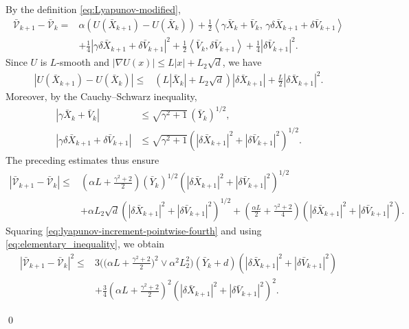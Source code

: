 \documentclass[12pt]{article}
\newenvironment{redtext}
  {\color{black}\ignorespaces}
  {\ignorespacesafterend}
\numberwithin{equation}{section}
\renewenvironment{proof}%
  {\begin{trivlist}%
   \item[]\ignorespaces}%
  {\qed\end{trivlist}}
\begin{document}
\begin{redtext}
\begin{proof}
By the definition \eqref{eq:Lyapunov-modified}, 
\begin{align}
\bar{\mathcal V}_{k+1}-\bar{\mathcal V}_k
={}&
\alpha
\left(
U(\bar X_{k+1})-U(\bar X_k)
\right)
+
\tfrac12
\left\langle
\gamma\bar X_k+\bar V_k,\,
\gamma\delta\bar X_{k+1}
+
\delta\bar V_{k+1}
\right\rangle
\nonumber\\
&+
\tfrac14
\left|
\gamma\delta\bar X_{k+1}
+
\delta\bar V_{k+1}
\right|^2
+
\tfrac12
\left\langle
\bar V_k,\delta\bar V_{k+1}
\right\rangle
+
\tfrac14
\left|
\delta\bar V_{k+1}
\right|^2
.
\label{eq:lyapunov-increment-expansion-fourth}
\end{align}
Since $U$ is $L$-smooth and
$|\nabla U(x)|\leq L|x|+L_2\sqrt d$, we have
\begin{align}
\left|
U(\bar X_{k+1})-U(\bar X_k)
\right|
\leq{}&
\left(
L|\bar X_k|+L_2\sqrt d
\right)
\left|
\delta\bar X_{k+1}
\right|
+
\tfrac L2
\left|
\delta\bar X_{k+1}
\right|^2.
\label{eq:potential-increment-pointwise-fourth}
\end{align}
Moreover, by the Cauchy--Schwarz inequality,
\begin{align}
\left|
\gamma\bar X_k+\bar V_k
\right|
&\leq
\sqrt{\gamma^2+1}\,
(\bar Y_k)^{1/2},
\nonumber\\
\left|
\gamma\delta\bar X_{k+1}
+
\delta\bar V_{k+1}
\right|
&\leq
\sqrt{\gamma^2+1}
\left(
|\delta\bar X_{k+1}|^2
+
|\delta\bar V_{k+1}|^2
\right)^{1/2}.
\label{eq:lyapunov-combination-bound-fourth}
\end{align}
The preceding estimates thus ensure
\begin{align}
\label{eq:lyapunov-increment-pointwise-fourth}
\left|
\bar{\mathcal V}_{k+1}-\bar{\mathcal V}_k
\right|
\leq{}&
\left(
\alpha L
+
\tfrac{\gamma^2+2}{2}
\right)
(\bar Y_k)^{1/2}
\left(
|\delta\bar X_{k+1}|^2
+
|\delta\bar V_{k+1}|^2
\right)^{1/2}
\\
&+
\alpha L_2\sqrt d
\left(
|\delta\bar X_{k+1}|^2
+
|\delta\bar V_{k+1}|^2
\right)^{1/2}
+
\left(
\tfrac{\alpha L}{2}
+
\tfrac{\gamma^2+2}{4}
\right)
\left(
|\delta\bar X_{k+1}|^2
+
|\delta\bar V_{k+1}|^2
\right).
\nonumber
\end{align}
Squaring \eqref{eq:lyapunov-increment-pointwise-fourth} and using \eqref{eq:elementary_inequality}, we obtain
\begin{align}
\left|
\bar{\mathcal V}_{k+1}-\bar{\mathcal V}_k
\right|^2
\leq{}&
3
\Big(
\big(
\alpha L
+
\tfrac{\gamma^2+2}{2}
\big)^2
\vee
\alpha^2L_2^2
\Big)
(\bar Y_k+d)
\left(
|\delta\bar X_{k+1}|^2
+
|\delta\bar V_{k+1}|^2
\right)
\nonumber\\
&+
\tfrac34
\left(
\alpha L
+
\tfrac{\gamma^2+2}{2}
\right)^2
\left(
|\delta\bar X_{k+1}|^2
+
|\delta\bar V_{k+1}|^2
\right)^2.
\label{eq:lyapunov-increment-square-fourth}
\end{align}


\end{proof}
\end{redtext}
\end{document}

